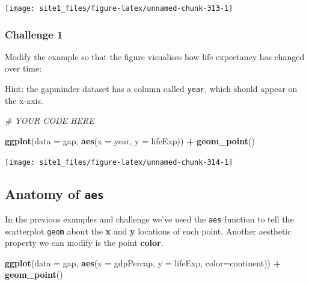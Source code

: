 \documentclass[]{book}
\newenvironment{Shaded}{\begin{snugshade}}{\end{snugshade}}
\newcommand{\KeywordTok}[1]{\textcolor[rgb]{0.13,0.29,0.53}{\textbf{#1}}}
\newcommand{\DataTypeTok}[1]{\textcolor[rgb]{0.13,0.29,0.53}{#1}}
\newcommand{\StringTok}[1]{\textcolor[rgb]{0.31,0.60,0.02}{#1}}
\newcommand{\CommentTok}[1]{\textcolor[rgb]{0.56,0.35,0.01}{\textit{#1}}}
\newcommand{\OperatorTok}[1]{\textcolor[rgb]{0.81,0.36,0.00}{\textbf{#1}}}
\newcommand{\NormalTok}[1]{#1}
\begin{document}
\begin{center}\texttt{[image: site1\_files/figure-latex/unnamed-chunk-313-1]} \end{center}

\subsubsection*{Challenge 1}\label{challenge-1-1}

Modify the example so that the figure visualises how life expectancy has
changed over time:

Hint: the gapminder dataset has a column called \texttt{year}, which
should appear on the x-axis.

\begin{Shaded}
\begin{Highlighting}[]
\CommentTok{# YOUR CODE HERE}

\KeywordTok{ggplot}\NormalTok{(}\DataTypeTok{data =}\NormalTok{ gap, }\KeywordTok{aes}\NormalTok{(}\DataTypeTok{x =}\NormalTok{ year, }\DataTypeTok{y =}\NormalTok{ lifeExp)) }\OperatorTok{+}\StringTok{ }
\StringTok{  }\KeywordTok{geom_point}\NormalTok{()}
\end{Highlighting}
\end{Shaded}

\begin{center}\texttt{[image: site1\_files/figure-latex/unnamed-chunk-314-1]} \end{center}

\subsection{\texorpdfstring{Anatomy of
\texttt{aes}}{Anatomy of aes}}\label{anatomy-of-aes}

In the previous examples and challenge we've used the \texttt{aes}
function to tell the scatterplot \texttt{geom} about the \textbf{x} and
\textbf{y} locations of each point. Another aesthetic property we can
modify is the point \textbf{color}.

\begin{Shaded}
\begin{Highlighting}[]
\KeywordTok{ggplot}\NormalTok{(}\DataTypeTok{data =}\NormalTok{ gap, }\KeywordTok{aes}\NormalTok{(}\DataTypeTok{x =}\NormalTok{ gdpPercap, }\DataTypeTok{y =}\NormalTok{ lifeExp, }\DataTypeTok{color=}\NormalTok{continent)) }\OperatorTok{+}\StringTok{ }
\StringTok{  }\KeywordTok{geom_point}\NormalTok{()}
\end{Highlighting}
\end{Shaded}
\end{document}
